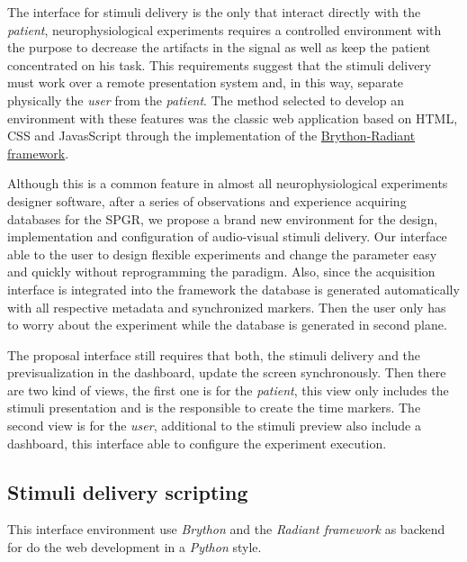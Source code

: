 The interface for stimuli delivery is the only that interact directly with the \textit{patient}, neurophysiological experiments requires a controlled environment with the purpose to decrease the artifacts \cite{vialatte2008eeg, gomez2006automatic} in the signal as well as keep the patient concentrated on his task. This requirements suggest that the stimuli delivery must work over a remote presentation system and, in this way, separate physically the \textit{user} from the \textit{patient}. The method selected to develop an environment with these features was the classic web application based on HTML, CSS and JavasScript through the implementation of the \hyperref[appendix:brython-radiant]{Brython-Radiant framework}.

Although this is a common feature in almost all neurophysiological experiments designer software, after a series of observations and experience acquiring databases for the SPGR, we propose a brand new environment for the design, implementation and configuration of audio-visual stimuli delivery. Our interface able to the user to design flexible experiments and change the parameter easy and quickly without reprogramming the paradigm. Also, since the acquisition interface is integrated into the framework the database is generated automatically with all respective metadata and synchronized markers. Then the user only has to worry about the experiment while the database is generated in second plane.



The proposal interface still requires that both, the stimuli delivery and the previsualization in the dashboard, update the screen synchronously. Then there are two kind of views, the first one is for the \textit{patient}, this view only includes the stimuli presentation and is the responsible to create the time markers. The second view is for the \textit{user}, additional to the stimuli preview also include a dashboard, this interface able to configure the experiment execution. 

\subsection{Stimuli delivery scripting}\label{ch4:stimuli_delivery_designer}%

This interface environment use \textit{Brython} and the \textit{Radiant framework} as backend for do the web development in a \textit{Python} style.

